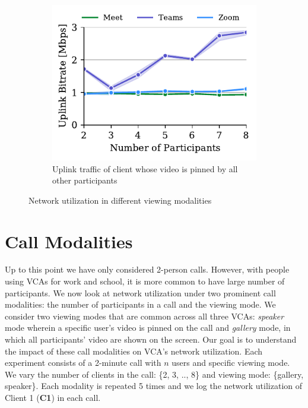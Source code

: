 \begin{figure}[ht]
\begin{subfigure}[t]{.33\textwidth}
    \label{fig:gallery-send}
\end{subfigure}
\hfill
\begin{subfigure}[t]{.33\textwidth}
  \centering
   \captionsetup{width=.9\linewidth}
    \includegraphics[width=1\textwidth,keepaspectratio]{../figures/modality/speaker_send.pdf}
    \caption{Uplink traffic of client whose video is pinned by all other participants}
    \label{fig:speaker-send}
\end{subfigure}
\caption{Network utilization in different viewing modalities}
\label{fig:viewing-mode}
\end{figure}

\section{Call Modalities}\label{sec:usage_modality}






Up to this point we have only considered 2-person calls. However, with people using VCAs for work and school, it is more common to have large number of participants. We now look at network utilization under two prominent call modalities: the number of participants in a call and the viewing mode. We consider two viewing modes that are common across all three VCAs: \textit{speaker} mode wherein a specific user's video is pinned on the call and \textit{gallery} mode, in which all participants' video are shown on the screen. Our goal is to understand the impact of these call modalities on VCA's network utilization. Each experiment consists of a 2-minute call with $n$ users and specific viewing mode. We vary the number of clients in the call: \{2, 3, .., 8\} and viewing mode: \{gallery, speaker\}. Each modality is repeated 5 times and we log the network utilization of Client 1 (\textbf{C1}) in each call. 


